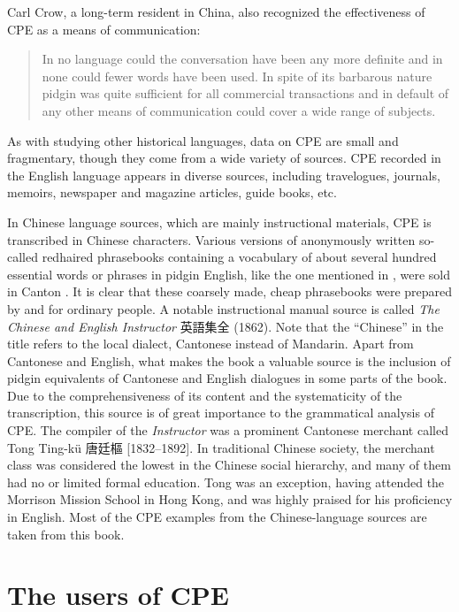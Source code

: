 \documentclass[output=paper]{langsci/langscibook}
\begin{document}
Carl Crow, a long-term resident in China, also recognized the effectiveness of CPE as a means of communication:

\begin{quote}
    In no language could the conversation have been any more definite and in none could fewer words have been used. In spite of its barbarous nature pidgin was quite sufficient for all commercial transactions and in default of any other means of communication could cover a wide range of subjects. \citep[31]{crow_foreign_2011}
\end{quote}

As with studying other historical languages, data on CPE are small and fragmentary, though they come from a wide variety of sources. CPE recorded in the English language appears in diverse sources, including travelogues, journals, memoirs, newspaper and magazine articles, guide books, etc.

In Chinese language sources, which are mainly instructional materials, CPE is transcribed in Chinese characters. Various versions of anonymously written so-called redhaired phrasebooks containing a vocabulary of about several hundred essential words or phrases in pidgin English, like the one mentioned in \citet{hunter_fan_1882}, were sold in Canton \citep{bolton_chinese_2003}. It is clear that these coarsely made, cheap phrasebooks were prepared by and for ordinary people. A notable instructional manual source is called \textit{The Chinese and English Instructor} {\cjkfont 英語集全} (1862). Note that the “Chinese” in the title refers to the local dialect, Cantonese instead of Mandarin. Apart from Cantonese and English, what makes the book a valuable source is the inclusion of pidgin equivalents of Cantonese and English dialogues in some parts of the book. Due to the comprehensiveness of its content and the systematicity of the transcription, this source is of great importance to the grammatical analysis of CPE. The compiler of the \textit{Instructor} was a prominent Cantonese merchant called Tong Ting-kü {\cjkfont 唐廷樞} [1832--1892]. In traditional Chinese society, the merchant class was considered the lowest in the Chinese social hierarchy, and many of them had no or limited formal education. Tong was an exception, having attended the Morrison Mission School in Hong Kong, and was highly praised for his proficiency in English. Most of the CPE examples from the Chinese-language sources are taken from this book.

\section{The users of CPE}
\end{document}
